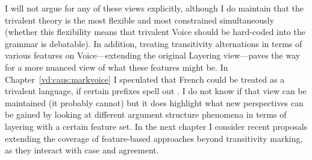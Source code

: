 I will not argue for any of these views explicitly, although I do maintain that the trivalent theory is the most flexible and most constrained simultaneously (whether this flexibility means that trivalent Voice should be hard-coded into the grammar is debatable). In addition, treating transitivity alternations in terms of various features on Voice---extending the original Layering view---paves the way for a more nuanced view of what these features might be. In Chapter~\ref{vd:caus:markvoice} I speculated that French could be treated as a trivalent language, if certain prefixes spell out {\vd}. I do not know if that view can be maintained (it probably cannot) but it does highlight what new perspectives can be gained by looking at different argument structure phenomena in terms of layering with a certain feature set. In the next chapter I consider recent proposals extending the coverage of feature-based approaches beyond transitivity marking, as they interact with case and agreement.